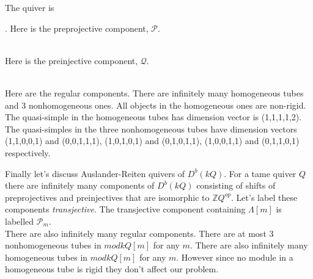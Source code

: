 \begin{example}
The quiver is .
\indent Here is the preprojective component, $\mathcal{P}$.\\
\\
Here is the preinjective component, $\mathcal{Q}$.\\
\\
\indent Here are the regular components. There are infinitely many homogeneous tubes and 3 nonhomogeneous ones. All objects in the homogeneous ones are non-rigid. The quasi-simple in the homogeneous tubes has dimension vector is (1,1,1,1,2). The quasi-simples in the three nonhomogeneous tubes have dimension vectors (1,1,0,0,1) and (0,0,1,1,1), (1,0,1,0,1) and (0,1,0,1,1), (1,0,0,1,1) and (0,1,1,0,1) respectively.\\
\end{example}
\indent Finally let's discuss Auslander-Reiten quivers of $D^b(kQ)$. For a tame quiver $Q$ there are infinitely many components of $D^b(kQ)$ consisting of shifts of preprojectives and preinjectives that are isomorphic to $\mathbb{Z}Q^{op}$. Let's label these components \textit{transjective}. The transjective component containing $\Lambda[m]$ is labelled $\mathcal{P}_m$.\\
\indent There are also infinitely many regular components. There are at most 3 nonhomogeneous tubes in $mod kQ[m]$ for any $m$. There are also infinitely many homogeneous tubes in $mod kQ[m]$ for any $m$. However since no module in a homogeneous tube is rigid they don't affect our problem.\\
